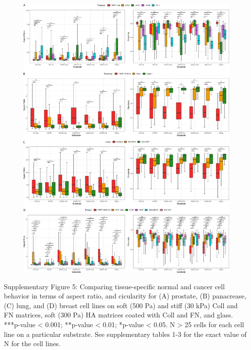 \documentclass[11pt,letterpaper,english,oneside]{article} %
\begin{document}
\begin{figure}[H]
    \hspace*{-1.5cm}
    \centering
    \includegraphics[scale=0.12]{../Figures/Supplementary_Figure5/supplementary_figure5.png}
    \caption{}
    \label{fig:fig5}
\end{figure}
\begin{adjustwidth}{1cm}{1cm}
  Supplementary Figure 5: Comparing tissue-specific normal and cancer cell behavior in terms of aspect ratio, and cicularity for (A) prostate, (B) panacrease, (C) lung, and (D) breast cell lines 
  on soft (500 Pa) and stiff (30 kPa) Coll and FN matrices, soft (300 Pa) HA matrices coated with Coll and FN, and glass. 
  ***p-value < 0.001; **p-value < 0.01; *p-value < 0.05. N > 25 cells for each cell line on a particular substrate. 
  See supplementary tables 1-3 for the exact value of N for the cell lines.
\end{adjustwidth}

\end{document}

